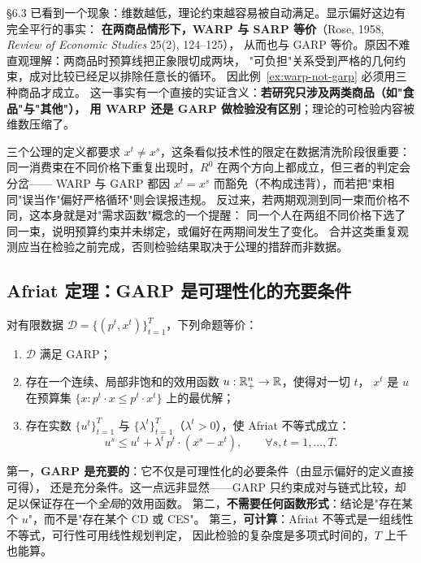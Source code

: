 \begin{remark}[两商品是例外]
\S 6.3 已看到一个现象：维数越低，理论约束越容易被自动满足。显示偏好这边有完全平行的事实：
\textbf{在两商品情形下，WARP 与 SARP 等价}（Rose, 1958, \emph{Review of Economic Studies} 25(2), 124--125），
从而也与 GARP 等价。原因不难直观理解：两商品时预算线把正象限切成两块，
"可负担"关系受到严格的几何约束，成对比较已经足以排除任意长的循环。
因此例~\ref{ex:warp-not-garp} 必须用三种商品才成立。
这一事实有一个直接的实证含义：\textbf{若研究只涉及两类商品（如"食品"与"其他"），
用 WARP 还是 GARP 做检验没有区别}；理论的可检验内容被维数压缩了。
\end{remark}

\begin{remark}
三个公理的定义都要求 $x^t\ne x^s$，这条看似技术性的限定在数据清洗阶段很重要：
同一消费束在不同价格下重复出现时，$R^0$ 在两个方向上都成立，但三者的判定会分岔——
WARP 与 GARP 都因 $x^t=x^s$ 而豁免（不构成违背），而若把"束相同"误当作"偏好严格循环"则会误报违规。
反过来，若两期观测到同一束而价格不同，这本身就是对"需求函数"概念的一个提醒：
同一个人在两组不同价格下选了同一束，说明预算约束并未绑定，或偏好在两期间发生了变化。
合并这类重复观测应当在检验之前完成，否则检验结果取决于公理的措辞而非数据。
\end{remark}

\subsection{Afriat 定理：GARP 是可理性化的充要条件}

\begin{theorem}\label{thm:afriat}
对有限数据 $\mathcal D=\{(p^t,x^t)\}_{t=1}^{T}$，下列命题等价：
\begin{enumerate}
\item $\mathcal D$ 满足 GARP；
\item 存在一个连续、局部非饱和的效用函数 $u:\mathbb{R}^n_+\to\mathbb{R}$，使得对一切 $t$，
      $x^t$ 是 $u$ 在预算集 $\{x:p^t\cdot x\le p^t\cdot x^t\}$ 上的最优解；
\item 存在实数 $\{u^t\}_{t=1}^{T}$ 与 $\{\lambda^t\}_{t=1}^{T}$（$\lambda^t>0$），使 Afriat 不等式成立：
      \[
       u^s\le u^t+\lambda^t\,p^t\cdot(x^s-x^t),\qquad \forall s,t=1,\ldots,T .
      \]
\end{enumerate}
\end{theorem}

\begin{remark}[定理的三层含义]
第一，\textbf{GARP 是充要的}：它不仅是可理性化的必要条件（由显示偏好的定义直接可得），
还是充分条件。这一点远非显然——GARP 只约束成对与链式比较，却足以保证存在一个\emph{全局}的效用函数。
第二，\textbf{不需要任何函数形式}：结论是"存在某个 $u$"，而不是"存在某个 CD 或 CES"。
第三，\textbf{可计算}：Afriat 不等式是一组线性不等式，可行性可用线性规划判定，
因此检验的复杂度是多项式时间的，$T$ 上千也能算。
\end{remark}

